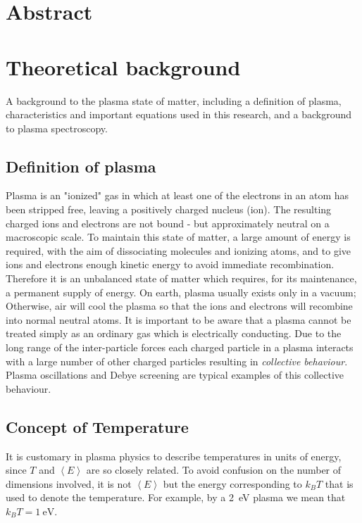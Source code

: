 \documentclass[justified,nofonts,nobib,openany]{tufte-book}
\begin{document}
\chapter{Abstract}\label{chap:abstract}
\chapter{Theoretical background}\label{chap:background}
A background to the plasma state of matter, including a definition of plasma, characteristics and important equations used in this research, and a background to plasma spectroscopy.
\section{Definition of plasma}
\marginnote{\textcolor{red}{Yes I know, I need to re--write it.}}
Plasma is an "ionized" gas in which at least one of the electrons in an atom has been stripped free, leaving a positively charged nucleus (ion). The resulting charged ions and electrons are not bound - but approximately neutral on a macroscopic scale. To maintain this state of matter, a large amount of energy is required, with the aim of dissociating molecules and ionizing atoms, and to give ions and electrons enough kinetic energy to avoid immediate recombination. Therefore it is an unbalanced state of matter which requires, for its maintenance, a permanent supply of energy. On earth, plasma usually exists only in a vacuum; Otherwise, air will cool the plasma so that the ions and electrons will recombine into normal neutral atoms. It is important to be aware that a plasma cannot be treated simply as an ordinary gas which is electrically conducting. Due to the long range of the inter-particle forces each charged particle in a plasma interacts with a large number of other charged particles resulting in \emph{collective behaviour}. Plasma oscillations and Debye screening are typical examples of this collective behaviour.
\section{Concept of Temperature}
It is customary in plasma physics to describe temperatures in units of energy, since $T$ and $\left<E\right>$ are so closely related. To avoid confusion on the number of dimensions involved, it is not $\left<E\right>$ but the energy corresponding to $k_B T$ that is used to denote the temperature. For example, by a \SI{2}{\electronvolt} plasma we mean that $k_B T = \SI{1}{\electronvolt}$.
\end{document}
